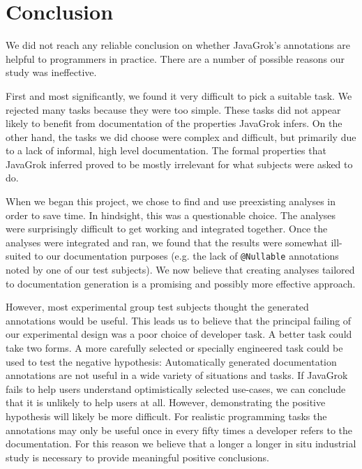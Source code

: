 \section{Conclusion}

We did not reach any reliable conclusion on whether JavaGrok's annotations are
helpful to programmers in practice. There are a number of possible reasons our
study was ineffective.

First and most significantly, we found it very difficult to pick a suitable
task.  We rejected many tasks because they were too simple.  These tasks did not
appear likely to benefit from documentation of the properties JavaGrok infers.
On the other hand, the tasks we did choose were complex and difficult, but primarily due
to a lack of informal, high level documentation.  The formal properties that
JavaGrok inferred proved to be mostly irrelevant for what subjects were asked to
do.

When we began this project, we chose to find and use preexisting analyses in
order to save time.  In hindsight, this was a questionable choice.  The analyses
were surprisingly difficult to get working and integrated together.  Once the
analyses were integrated and ran, we found that the results were somewhat
ill-suited to our documentation purposes (e.g. the lack of \texttt{@Nullable}
annotations noted by one of our test subjects). We now believe that creating
analyses tailored to documentation generation is a promising and possibly more effective
approach.

However, most experimental group test subjects thought the generated annotations would be
useful.  This leads us to believe that the principal failing of our experimental
design was a poor choice of developer task.  A better task could take two forms.  A more carefully
selected or specially engineered task could be used to test the negative
hypothesis:  Automatically generated documentation annotations are not useful in
a wide variety of situations and tasks.  If JavaGrok fails to help users
understand optimistically selected use-cases, we can conclude that it is
unlikely to help users at all.  However, demonstrating the positive hypothesis
will likely be more difficult.  For realistic programming tasks the annotations
may only be useful once in every fifty times a developer refers to the
documentation.  For this reason we believe that a longer a longer in situ
industrial study is necessary to provide meaningful positive conclusions.

